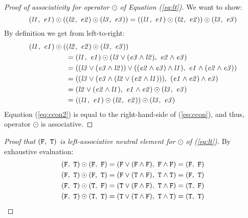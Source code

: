 \begin{proof}[Proof of associativity for operator $\odot$ of Equation (\ref{eq:lt})] We want to show:
  \begin{equation}
    \label{eq:ccon}
    (\mathit{l1},~\mathit{e1}) \odot ((\mathit{l2},~\mathit{e2}) \odot (\mathit{l3},~\mathit{e3})) = ((\mathit{l1},~\mathit{e1}) \odot (\mathit{l2},~\mathit{e2})) \odot (\mathit{l3},~\mathit{e3})
\end{equation}
  By definition we get from left-to-right:
\begin{align}
  (\mathit{l1},~\mathit{e1}) \odot (&(\mathit{l2},~\mathit{e2}) \odot (\mathit{l3},~\mathit{e3}))\\
  &= (\mathit{l1},~\mathit{e1}) \odot (\mathit{l3} \lor (\mathit{e3} \land \mathit{l2}),~\mathit{e2} \land \mathit{e3})\\
  &= ((\mathit{l3} \lor (\mathit{e3} \land \mathit{l2})) \lor ((\mathit{e2} \land \mathit{e3}) \land \mathit{l1}),~\mathit{e1} \land (\mathit{e2} \land \mathit{e3}))\\
  &= ((\mathit{l3} \lor (\mathit{e3} \land (\mathit{l2} \lor (\mathit{e2} \land \mathit{l1}))),~(\mathit{e1} \land \mathit{e2}) \land \mathit{e3})\\
  &= (\mathit{l2} \lor (\mathit{e2} \land \mathit{l1}),~\mathit{e1} \land \mathit{e2}) \odot (\mathit{l3},~\mathit{e3})\\
  &= ((\mathit{l1},~\mathit{e1}) \odot (\mathit{l2},~\mathit{e2})) \odot (\mathit{l3},~\mathit{e3})\label{eq:ccon2}
\end{align}
Equation (\ref{eq:ccon2}) is equal to the right-hand-side of (\ref{eq:ccon}), and thus, operator $\odot$ is associative.
\end{proof}

\begin{proof}[Proof that $(\mathtt{F},~\mathtt{T})$ is left-associative neutral element for $\odot$ of (\ref{eq:lt})] By exhaustive evaluation:
\begin{align}
  \label{eq:otimesneproof}
  (\mathtt{F},~\mathtt{T}) \odot (\mathtt{F},~\mathtt{F}) &= (\mathtt{F} \lor (\mathtt{F} \land \mathtt{F}),~\mathtt{F} \land \mathtt{F}) = (\mathtt{F},~\mathtt{F}) \\
  (\mathtt{F},~\mathtt{T}) \odot (\mathtt{F},~\mathtt{T}) &= (\mathtt{F} \lor (\mathtt{T} \land \mathtt{F}),~\mathtt{T} \land \mathtt{T}) = (\mathtt{F},~\mathtt{T}) \\
  (\mathtt{F},~\mathtt{T}) \odot (\mathtt{T},~\mathtt{F}) &= (\mathtt{T} \lor (\mathtt{F} \land \mathtt{F}),~\mathtt{T} \land \mathtt{F}) = (\mathtt{T},~\mathtt{F}) \\
  (\mathtt{F},~\mathtt{T}) \odot (\mathtt{T},~\mathtt{T}) &= (\mathtt{T} \lor (\mathtt{T} \land \mathtt{F}),~\mathtt{T} \land \mathtt{T}) = (\mathtt{T},~\mathtt{T})
\end{align}
\end{proof}


